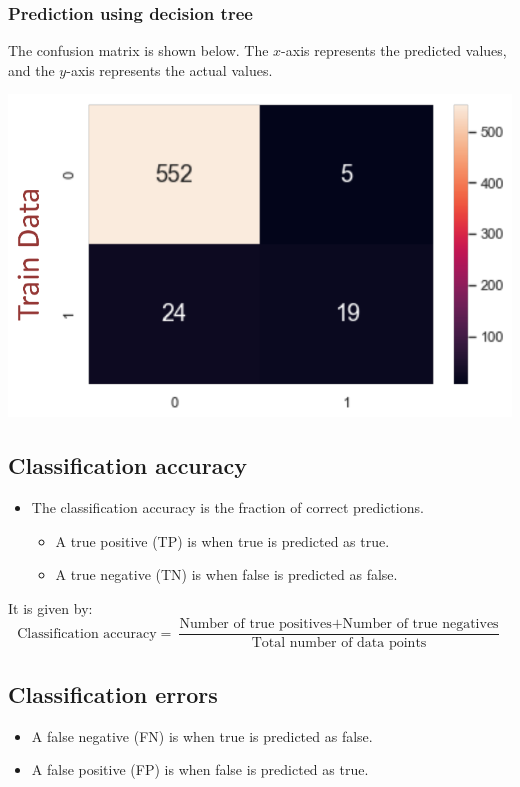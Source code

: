 \documentclass[11pt]{article}
\begin{document}
\subsubsection{Prediction using decision tree}
\label{sec:org1d59fc6}
The confusion matrix is shown below. The \(x\)-axis represents the predicted values, and the \(y\)-axis represents the actual values.
\begin{center}
\includegraphics[width=.9\linewidth]{./images/binary-classification-training-data-prediction.png}
\end{center}
\subsection{Classification accuracy}
\label{sec:orgcb0699a}
\begin{itemize}
\item The classification accuracy is the fraction of correct predictions.
\begin{itemize}
\item A true positive (TP) is when true is predicted as true.
\item A true negative (TN) is when false is predicted as false.
\end{itemize}
\end{itemize}

It is given by:
\[\text{Classification accuracy} = \frac{\text{Number of true positives} + \text{Number of true negatives}}{\text{Total number of data points}}\]
\subsection{Classification errors}
\label{sec:org5f9cb08}
\begin{itemize}
\item A false negative (FN) is when true is predicted as false.
\item A false positive (FP) is when false is predicted as true.
\end{itemize}
\end{document}
